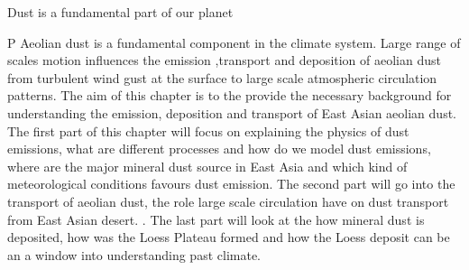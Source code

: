 Dust is a fundamental part of our planet  

P Aeolian dust is a fundamental component in the climate system. Large range of scales motion influences the emission 
,transport and deposition of aeolian dust from turbulent wind gust at the surface to large scale atmospheric circulation 
patterns. The aim of this chapter is to the provide the necessary background for understanding the emission, deposition 
and transport of East Asian aeolian dust. The first part of this chapter will focus on explaining the physics of dust 
emissions, what are different processes and how do we model dust emissions, where are the major mineral dust source in 
East Asia and which kind of meteorological conditions favours dust emission. The second part will go into the transport 
of aeolian dust, the role large scale circulation have on dust transport from East Asian desert. . The last part will look at the how mineral dust is deposited, how was the 
Loess Plateau formed and how the Loess deposit can be an a window into understanding past climate.